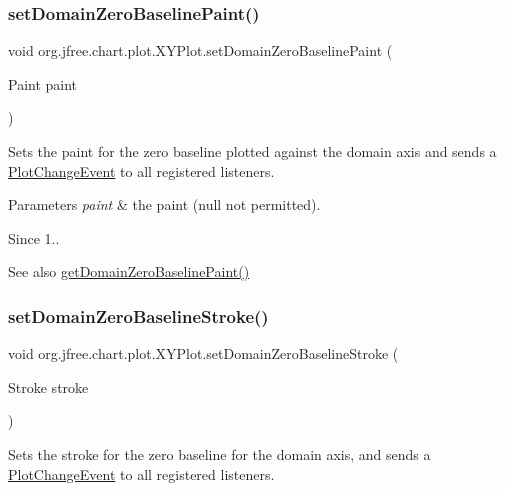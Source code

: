 \subsubsection{\texorpdfstring{set\+Domain\+Zero\+Baseline\+Paint()}{setDomainZeroBaselinePaint()}}
{\footnotesize\ttfamily void org.\+jfree.\+chart.\+plot.\+X\+Y\+Plot.\+set\+Domain\+Zero\+Baseline\+Paint (\begin{DoxyParamCaption}\item[{Paint}]{paint }\end{DoxyParamCaption})}

Sets the paint for the zero baseline plotted against the domain axis and sends a \mbox{\hyperlink{}{Plot\+Change\+Event}} to all registered listeners.


\begin{DoxyParams}{Parameters}
{\em paint} & the paint ({\ttfamily null} not permitted).\\
\hline
\end{DoxyParams}
\begin{DoxySince}{Since}
1..
\end{DoxySince}
\begin{DoxySeeAlso}{See also}
\mbox{\hyperlink{classorg_1_1jfree_1_1chart_1_1plot_1_1_x_y_plot_ac5e572ae0c60a41e40abfa670caa66e7}{get\+Domain\+Zero\+Baseline\+Paint()}} 
\end{DoxySeeAlso}
\mbox{\label{classorg_1_1jfree_1_1chart_1_1plot_1_1_x_y_plot_ad1aceb453eac28dec65962270a491361}} 
\subsubsection{\texorpdfstring{set\+Domain\+Zero\+Baseline\+Stroke()}{setDomainZeroBaselineStroke()}}
{\footnotesize\ttfamily void org.\+jfree.\+chart.\+plot.\+X\+Y\+Plot.\+set\+Domain\+Zero\+Baseline\+Stroke (\begin{DoxyParamCaption}\item[{Stroke}]{stroke }\end{DoxyParamCaption})}

Sets the stroke for the zero baseline for the domain axis, and sends a \mbox{\hyperlink{}{Plot\+Change\+Event}} to all registered listeners.


